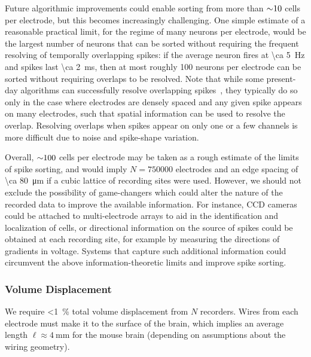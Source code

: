 Future algorithmic improvements could enable sorting from more than ${\sim}\num{10}$ cells per electrode, but this becomes increasingly challenging. One simple estimate of a reasonable practical limit, for the regime of many neurons per electrode, would be the largest number of neurons that can be sorted without requiring the frequent resolving of temporally overlapping spikes: if the average neuron fires at \SI{\ca 5}{\hertz} and spikes last \SI{\ca 2}{\milli\second}, then at most roughly \num{100} neurons per electrode can be sorted without requiring overlaps to be resolved.  Note that while some present-day algorithms can successfully resolve overlapping spikes~\cite{marre12,pillow13,segev04,ge2011,prentice2011}, they typically do so only in the case where electrodes are densely spaced and any given spike appears on many electrodes, such that spatial information can be used to resolve the overlap. Resolving overlaps when spikes appear on only one or a few channels is more difficult due to noise and spike-shape variation.

Overall,  ${\sim}\num{100}$ cells per electrode may be taken as a rough estimate of the limits of spike sorting, and would imply $N = \num{750000}$ electrodes and an edge spacing of \SI{\ca 80}{\micro\meter} if a cubic lattice of recording sites were used.  However, we should not exclude the possibility of game-changers which could alter the nature of the recorded data to improve the available information. For instance, CCD cameras could be attached to multi-electrode arrays to aid in the identification and localization of cells, or directional information on the source of spikes could be obtained at each recording site, for example by measuring the directions of gradients in voltage. Systems that capture such additional information could circumvent the above information-theoretic limits and improve spike sorting.

\subsubsection{Volume Displacement}

We require \SI{<1}{\percent} total volume displacement from $N$ recorders.
Wires from each electrode must make it to the surface of the brain, which implies an average length $\ell\approx\SI{4}{\milli\meter}$ for the mouse brain (depending on assumptions about the wiring geometry).

